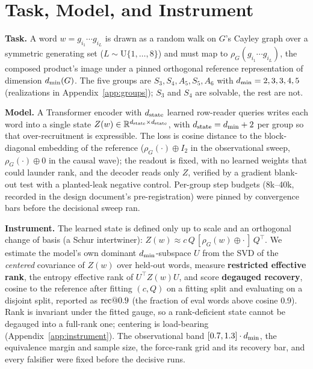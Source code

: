 \section{Task, Model, and Instrument}
\label{sec:setup}

\textbf{Task.} A word $w = g_{i_1} \cdots g_{i_L}$ is drawn as a random
walk on $G$'s Cayley graph over a symmetric generating set
($L \sim \mathrm{U}\{1,\dots,8\}$) and must map to
$\rho_G(g_{i_1} \cdots g_{i_L})$, the composed product's image under a
pinned orthogonal reference representation of dimension $d_{\min}(G)$. The
five groups are $S_3, S_4, A_5, S_5, A_6$ with $d_{\min} = 2, 3, 3, 4, 5$
(realizations in Appendix~\ref{app:groups}); $S_3$ and $S_4$ are
solvable, the rest are not.

\textbf{Model.} A Transformer encoder with $d_{\mathrm{state}}$ learned row-reader
queries writes each word into a single state
$Z(w) \in \mathbb{R}^{d_{\mathrm{state}} \times d_{\mathrm{state}}}$, with $d_{\mathrm{state}} = d_{\min} + 2$ per
group so that over-recruitment is expressible. The loss is cosine
distance to the block-diagonal embedding of the reference
($\rho_G(\cdot) \oplus I_2$ in the observational sweep,
$\rho_G(\cdot) \oplus 0$ in the causal wave); the readout is fixed, with
no learned weights that could launder rank, and the decoder reads only
$Z$, verified by a gradient blank-out test with a planted-leak negative
control. Per-group step budgets (8k--40k, recorded in the design
document's pre-registration) were pinned by convergence bars before the
decisional sweep ran.

\textbf{Instrument.} The learned state is defined only up to scale and
an orthogonal change of basis (a Schur intertwiner):
$Z(w) \approx c\,Q\,[\rho_G(w) \oplus \cdot\,]\,Q^{\top}$. We estimate
the model's own dominant $d_{\min}$-subspace $U$ from the SVD of the
\emph{centered} covariance of $Z(w)$ over held-out words, measure
\textbf{restricted effective rank}, the entropy effective rank of
$U^{\top} Z(w) U$, and score \textbf{degauged recovery}, cosine to the
reference after fitting $(c, Q)$ on a fitting split and evaluating on a
disjoint split, reported as $\mathrm{rec}@0.9$ (the fraction of eval words
above cosine 0.9). Rank is invariant under the fitted gauge, so a
rank-deficient state cannot be degauged into a full-rank one; centering
is load-bearing (Appendix~\ref{app:instrument}). The observational band
$[0.7, 1.3] \cdot d_{\min}$, the equivalence margin and sample size, the
force-rank grid and its recovery bar, and every falsifier were fixed
before the decisive runs.
